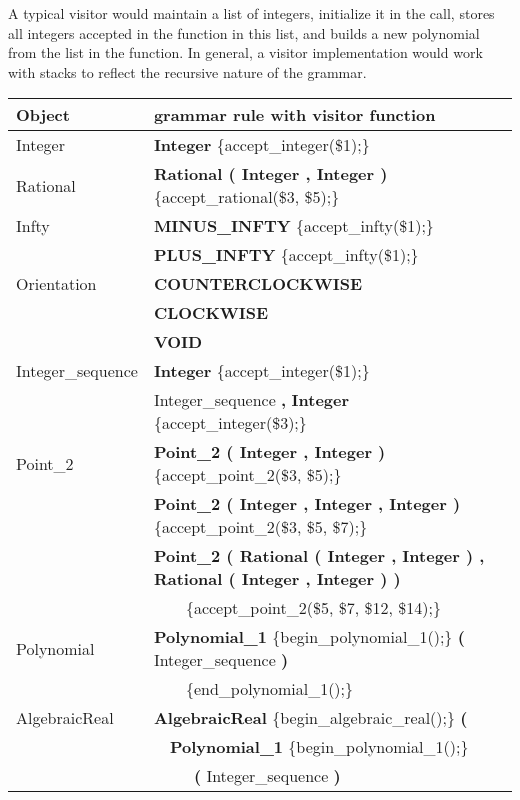 A typical visitor would maintain a list of integers, initialize
it in the  call, stores all integers
accepted in the  function in this list,
and builds a new polynomial from the list in the
 function. In general, a visitor
implementation would work with stacks to reflect the recursive nature
of the grammar.

\begin{ccTexOnly}
\begin{tabular}{*{2}{| l} |} \hline
Object   & grammar rule with visitor function          \\ \hline \hline
Integer  & {\bf Integer} \{accept\_integer(\$1);\}  \\ \hline
Rational & {\bf Rational ( Integer , Integer )} \{accept\_rational(\$3, \$5);\} \\ \hline
 Infty    & {\bf MINUS\_INFTY} \{accept\_infty(\$1);\}  \\ 
          & {\bf PLUS\_INFTY} \{accept\_infty(\$1);\}  \\ \hline
Orientation  & {\bf COUNTERCLOCKWISE} \\
             & {\bf CLOCKWISE} \\
             & {\bf VOID}          \\ \hline
Integer\_sequence &  {\bf Integer} \{accept\_integer(\$1);\} \\
                  & Integer\_sequence {\bf \Large ,} {\bf Integer} \{accept\_integer(\$3);\} \\ \hline
 Point\_2 & {\bf Point\_2 ( Integer , Integer )} \{accept\_point\_2(\$3, \$5);\} \\ 
          & {\bf Point\_2 ( Integer , Integer , Integer )} \{accept\_point\_2(\$3, \$5, \$7);\} \\
          & {\bf Point\_2 ( Rational ( Integer , Integer ) , Rational ( Integer , Integer ) )}\\
          & \ \ \ \ \{accept\_point\_2(\$5, \$7, \$12, \$14);\} \\ \hline
Polynomial &  {\bf Polynomial\_1} \{begin\_polynomial\_1();\} {\bf \Large (} Integer\_sequence {\bf \Large )}\\
           & \ \ \ \ \{end\_polynomial\_1();\} \\ \hline
AlgebraicReal & {\bf AlgebraicReal} \{begin\_algebraic\_real();\} {\bf \Large (}\\
              & \ \ {\bf Polynomial\_1} \{begin\_polynomial\_1();\}\\
              & \ \ \ \ \ {\bf \Large (} Integer\_sequence {\bf \Large )}\\

\end{tabular}
\end{ccTexOnly}
